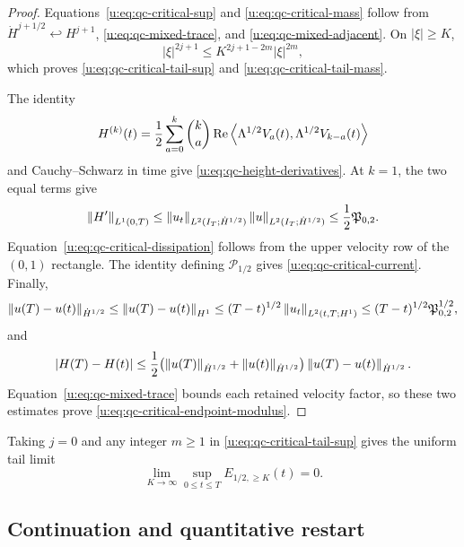 \begin{proof}
Equations~\eqref{u:eq:qc-critical-sup} and
\eqref{u:eq:qc-critical-mass} follow from
\(\dot H^{j+1/2}\hookleftarrow H^{j+1}\),
\eqref{u:eq:qc-mixed-trace}, and \eqref{u:eq:qc-mixed-adjacent}.
On \(|\xi|\ge K\),
\[
 |\xi|^{2j+1}\le K^{2j+1-2m}|\xi|^{2m},
\]
which proves \eqref{u:eq:qc-critical-tail-sup} and
\eqref{u:eq:qc-critical-tail-mass}.

The identity
\[
 H^{(k)}(t)
 =\frac12\sum_{a=0}^{k}\binom ka
 \operatorname{Re}\left\langle \Lambda^{1/2}V_a(t),\Lambda^{1/2}V_{k-a}(t)\right\rangle
\]
and Cauchy--Schwarz in time give
\eqref{u:eq:qc-height-derivatives}.  At \(k=1\), the two equal terms give
\[
 \left\lVert H'\right\rVert_{L^1(0,T)}
 \le\left\lVert u_t\right\rVert_{L^2(I_T;\dot H^{1/2})}
     \left\lVert u\right\rVert_{L^2(I_T;\dot H^{1/2})}
 \le\frac12\mathfrak P_{0,2}.
\]
Equation~\eqref{u:eq:qc-critical-dissipation} follows from the upper velocity
row of the \((0,1)\) rectangle.  The identity defining
\(\mathcal P_{1/2}\) gives \eqref{u:eq:qc-critical-current}.  Finally,
\[
 \left\lVert u(T)-u(t)\right\rVert_{\dot H^{1/2}}
 \le\left\lVert u(T)-u(t)\right\rVert_{H^1}
 \le(T-t)^{1/2}\left\lVert u_t\right\rVert_{L^2(t,T;H^1)}
 \le(T-t)^{1/2}\mathfrak P_{0,2}^{1/2},
\]
and
\[
 |H(T)-H(t)|
 \le\frac12\bigl(
 \left\lVert u(T)\right\rVert_{\dot H^{1/2}}+\left\lVert u(t)\right\rVert_{\dot H^{1/2}}
 \bigr)\left\lVert u(T)-u(t)\right\rVert_{\dot H^{1/2}}.
\]
Equation~\eqref{u:eq:qc-mixed-trace} bounds each retained velocity factor, so
these two estimates prove \eqref{u:eq:qc-critical-endpoint-modulus}.
\end{proof}

Taking \(j=0\) and any integer \(m\ge1\) in
\eqref{u:eq:qc-critical-tail-sup} gives the uniform tail limit
\begin{equation}
 \lim_{K\to\infty}\sup_{0\le t\le T}
 E_{1/2,\ge K}(t)=0.
 \label{u:eq:qc-critical-tail-extinction}
\end{equation}

\subsection{Continuation and quantitative restart}

